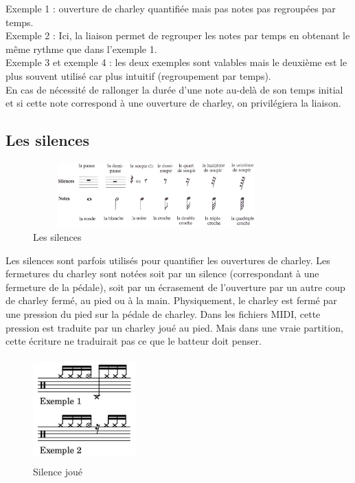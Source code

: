 Exemple 1 : ouverture de charley quantifiée mais pas notes pas regroupées par temps.\\
Exemple 2 : Ici, la liaison permet de regrouper les notes par temps en obtenant le même rythme que dans l’exemple 1.\\
Exemple 3 et exemple 4 : les deux exemples sont valables mais le deuxième est le plus souvent utilisé car plus intuitif (regroupement par temps).\\
En cas de nécessité de rallonger la durée d’une note au-delà de son temps initial et si cette note correspond à une ouverture de charley, on privilégiera la liaison.
\subsection*{Les silences}
\begin{figure}[h]
	\centering
	\includegraphics[height=25mm, width=95mm]{z_images/3_methodes/0_notation_de_la_batterie/4_silences.png}
	\caption{Les silences}
	\label{silences}
\end{figure}\newpage
Les silences sont parfois utilisés pour quantifier les ouvertures de charley. Les fermetures du charley sont notées soit par un silence (correspondant à une fermeture de la pédale), soit par un écrasement de l’ouverture par un autre coup de charley fermé, au pied ou à la main.
Physiquement, le charley est fermé par une pression du pied sur la pédale de charley. Dans les fichiers MIDI, cette pression est traduite par un charley joué au pied. Mais dans une vraie partition, cette écriture ne traduirait pas ce que le batteur doit penser.
\begin{figure}[h]
	\centering
	\includegraphics[height=40mm, width=40mm]{z_images/3_methodes/0_notation_de_la_batterie/5_silence_joue.png}
	\caption{Silence joué}
	\label{silence joue}
\end{figure}\\
